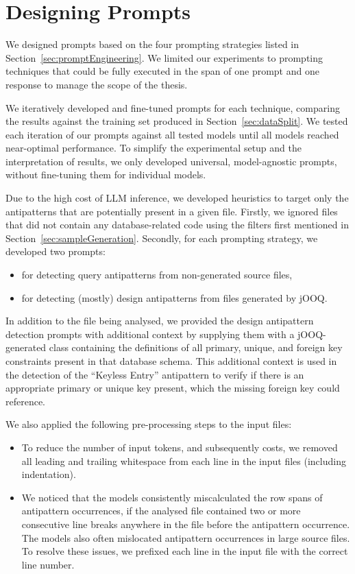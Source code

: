\section{Designing Prompts}\label{sec:prompts}

We designed prompts based on the four prompting strategies listed in Section~\ref{sec:promptEngineering}. We limited our experiments to prompting techniques that could be fully executed in the span of one prompt and one response to manage the scope of the thesis.

We iteratively developed and fine-tuned prompts for each technique, comparing the results against the training set produced in Section~\ref{sec:dataSplit}. We tested each iteration of our prompts against all tested models until all models reached near-optimal performance. To simplify the experimental setup and the interpretation of results, we only developed universal, model-agnostic prompts, without fine-tuning them for individual models.

Due to the high cost of LLM inference, we developed heuristics to target only the antipatterns that are potentially present in a given file. Firstly, we ignored files that did not contain any database-related code using the filters first mentioned in Section~\ref{sec:sampleGeneration}. Secondly, for each prompting strategy, we developed two prompts: 

\begin{itemize}
    \item for detecting query antipatterns from non-generated source files,
    \item for detecting (mostly) design antipatterns from files generated by jOOQ.
\end{itemize}

In addition to the file being analysed, we provided the design antipattern detection prompts with additional context by supplying them with a jOOQ-generated class containing the definitions of all primary, unique, and foreign key constraints present in that database schema. This additional context is used in the detection of the “Keyless Entry” antipattern to verify if there is an appropriate primary or unique key present, which the missing foreign key could reference.

We also applied the following pre-processing steps to the input files:
\begin{itemize}
    \item To reduce the number of input tokens, and subsequently costs, we removed all leading and trailing whitespace from each line in the input files (including indentation).
    \item We noticed that the models consistently miscalculated the row spans of antipattern occurrences, if the analysed file contained two or more consecutive line breaks anywhere in the file before the antipattern occurrence. The models also often mislocated antipattern occurrences in large source files. To resolve these issues, we prefixed each line in the input file with the correct line number.
\end{itemize}


